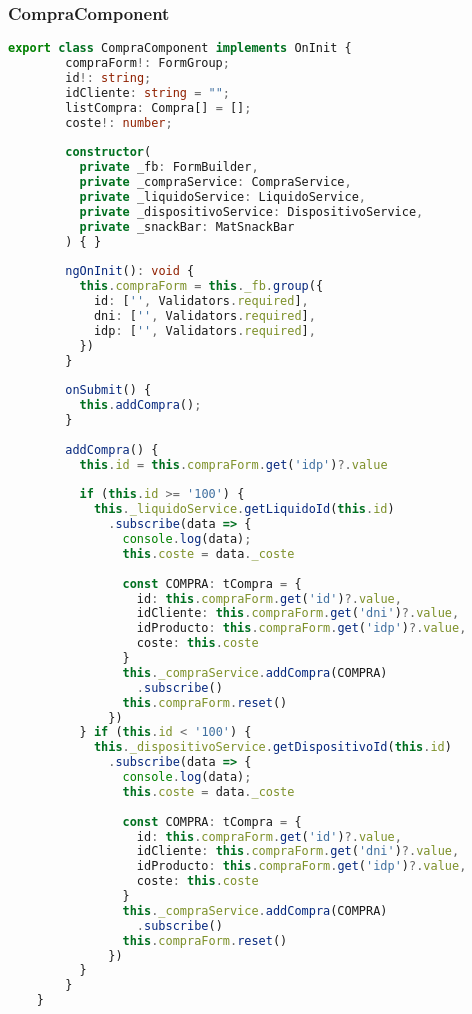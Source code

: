 \documentclass[a4paper]{article} %
\begin{document}
\subsubsection{CompraComponent}
\begin{lstlisting}[language=Typescript]
	export class CompraComponent implements OnInit {
		compraForm!: FormGroup;
		id!: string;
		idCliente: string = "";
		listCompra: Compra[] = [];
		coste!: number;
	  
		constructor(
		  private _fb: FormBuilder,
		  private _compraService: CompraService,
		  private _liquidoService: LiquidoService,
		  private _dispositivoService: DispositivoService,
		  private _snackBar: MatSnackBar
		) { }
	  
		ngOnInit(): void {
		  this.compraForm = this._fb.group({
			id: ['', Validators.required],
			dni: ['', Validators.required],
			idp: ['', Validators.required],
		  })
		}
	  
		onSubmit() {
		  this.addCompra();
		}
	  
		addCompra() {
		  this.id = this.compraForm.get('idp')?.value
	  
		  if (this.id >= '100') {
			this._liquidoService.getLiquidoId(this.id)
			  .subscribe(data => {
				console.log(data);
				this.coste = data._coste
	  
				const COMPRA: tCompra = {
				  id: this.compraForm.get('id')?.value,
				  idCliente: this.compraForm.get('dni')?.value,
				  idProducto: this.compraForm.get('idp')?.value,
				  coste: this.coste
				}
				this._compraService.addCompra(COMPRA)
				  .subscribe()
				this.compraForm.reset()
			  })
		  } if (this.id < '100') {
			this._dispositivoService.getDispositivoId(this.id)
			  .subscribe(data => {
				console.log(data);
				this.coste = data._coste
	  
				const COMPRA: tCompra = {
				  id: this.compraForm.get('id')?.value,
				  idCliente: this.compraForm.get('dni')?.value,
				  idProducto: this.compraForm.get('idp')?.value,
				  coste: this.coste
				}
				this._compraService.addCompra(COMPRA)
				  .subscribe()
				this.compraForm.reset()
			  })
		  }
		}
	}	  
\end{lstlisting}\clearpage
\end{document}
